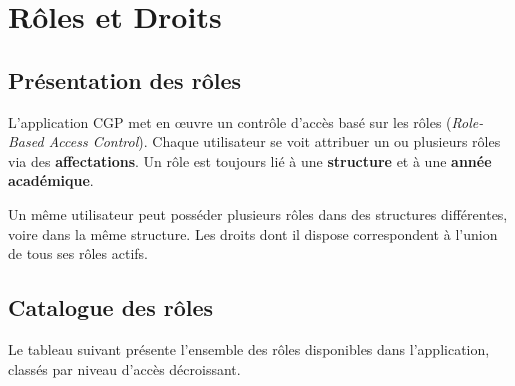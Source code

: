 \chapter{R\^oles et Droits}
\label{chap:roles}

\section{Pr\'esentation des r\^oles}

L'application CGP met en \oe uvre un contr\^ole d'acc\`es bas\'e sur les r\^oles (\textit{Role-Based Access Control}). Chaque utilisateur se voit attribuer un ou plusieurs r\^oles via des \textbf{affectations}. Un r\^ole est toujours li\'e \`a une \textbf{structure} et \`a une \textbf{ann\'ee acad\'emique}.

\medskip
\begin{notebox}
  Un m\^eme utilisateur peut poss\'eder plusieurs r\^oles dans des structures diff\'erentes, voire dans la m\^eme structure. Les droits dont il dispose correspondent \`a l'union de tous ses r\^oles actifs.
\end{notebox}

\section{Catalogue des r\^oles}

Le tableau suivant pr\'esente l'ensemble des r\^oles disponibles dans l'application, class\'es par niveau d'acc\`es d\'ecroissant.

